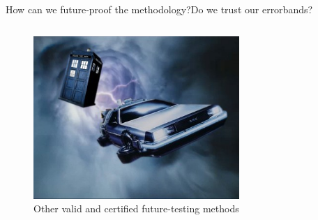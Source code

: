 \begin{frame}{How can we future-proof the methodology?}{Do we trust our errorbands?}
\begin{columns}
        \vspace{-1.9cm}
        \begin{figure}
            \captionsetup{format=smol}
            \includegraphics[width=0.7\textwidth]{juan_future_hyperopt/tardisdelorean.jpg}
            \caption{\tiny Other valid and certified future-testing methods}
        \end{figure}
    \end{columns}



\end{frame}


